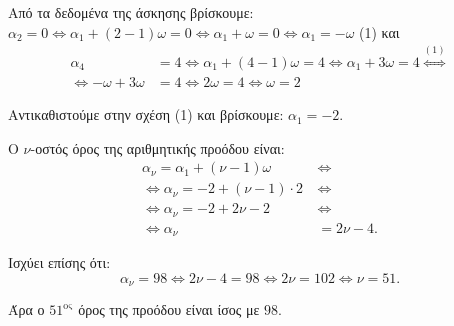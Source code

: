 
\begin{alist}
\item Από τα δεδομένα της άσκησης βρίσκουμε:
$\alpha_2 = 0 \Leftrightarrow \alpha_1 + (2 - 1)\omega = 0 \Leftrightarrow \alpha_1 + \omega = 0 \Leftrightarrow \alpha_1 = -\omega$ (1)
και
\begin{align*}
\alpha_4 &= 4 \Leftrightarrow \alpha_1 + (4 - 1)\omega = 4 \Leftrightarrow \alpha_1 + 3\omega = 4 \stackrel{(1)}{\Leftrightarrow} \\
\Leftrightarrow -\omega + 3\omega &= 4 \Leftrightarrow 2\omega = 4 \Leftrightarrow \omega = 2
\end{align*}

Αντικαθιστούμε στην σχέση (1) και βρίσκουμε:
$\alpha_1 = -2$.

\item Ο $\nu$-οστός όρος της αριθμητικής προόδου είναι:
\begin{align*}
\alpha_\nu = \alpha_1 + (\nu - 1)\omega \ &\Leftrightarrow \\
\Leftrightarrow \alpha_\nu = -2 + (\nu - 1) \cdot 2 \ &\Leftrightarrow \\
\Leftrightarrow \alpha_\nu = -2 + 2\nu - 2 \ &\Leftrightarrow \\
\Leftrightarrow \alpha_\nu &= 2\nu - 4.
\end{align*}

Ισχύει επίσης ότι:
\[\alpha_\nu = 98 \Leftrightarrow 2\nu - 4 = 98 \Leftrightarrow 2\nu = 102 \Leftrightarrow \nu = 51.\]

Άρα ο $51^{\text{ος}}$ όρος της προόδου είναι ίσος με $98$.
\end{alist}

